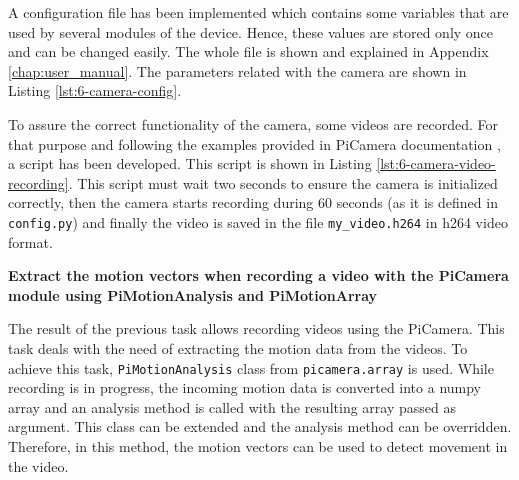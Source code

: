 A configuration file has been implemented which contains some variables that are used by several modules of the device. Hence, these values are stored only once and can be changed easily. The whole file is shown and explained in Appendix \ref{chap:user_manual}. The parameters related with the camera are shown in Listing \ref{lst:6-camera-config}.



To assure the correct functionality of the camera, some videos are recorded. For that purpose and following the examples provided in PiCamera documentation \cite{PiCameraDoc}, a script has been developed. This script is shown in Listing \ref{lst:6-camera-video-recording}. This script must wait two seconds to ensure the camera is initialized correctly, then the camera starts recording during 60 seconds (as it is defined in \texttt{config.py}) and finally the video is saved in the file \texttt{my\_video.h264} in h264 video format.




\textbf{Extract the motion vectors when recording a video with the PiCamera module using PiMotionAnalysis and PiMotionArray}

The result of the previous task allows recording videos using the PiCamera. This task deals with the need of extracting the motion data from the videos. To achieve this task, \texttt{PiMotionAnalysis} class from \texttt{picamera.array} is used. While recording is in progress, the incoming motion data is converted into a numpy array and an analysis method is called with the resulting array passed as argument. This class can be extended and the analysis method can be overridden. Therefore, in this method, the motion vectors can be used to detect movement in the video.


